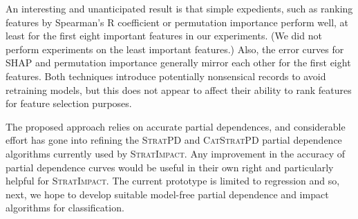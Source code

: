 \documentclass[11pt]{article}
\newcommand{\simp}{\fontfamily{cmr}\textsc{\small StratImpact}}
\newcommand{\spd}{\fontfamily{cmr}\textsc{\small StratPD}}
\newcommand{\cspd}{\fontfamily{cmr}\textsc{\small CatStratPD}}
\begin{document}
An interesting and unanticipated result is that simple expedients, such as ranking features by Spearman's R coefficient or permutation importance perform well, at least for the first eight important features in our experiments. (We did not perform experiments on the least important features.) Also, the error curves for SHAP and permutation importance generally mirror each other for the first eight features.  Both techniques introduce potentially nonsensical records to avoid retraining models, but this does not appear to affect their ability to rank features for feature selection purposes.

The proposed approach relies on accurate partial dependences, and considerable effort has gone into refining the \spd{} and \cspd{} partial dependence algorithms currently used by \simp.  Any improvement in the accuracy of partial dependence curves would be useful in their own right and particularly helpful for \simp.  The current prototype is limited to regression and so, next, we hope to develop suitable model-free partial dependence and impact algorithms for classification.
\end{document}
